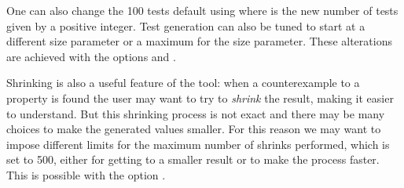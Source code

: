 
%
%
%


%
%
%


%
One can also change the 100 tests default  using  where
 is the new number of tests given by a positive integer.
%
%
Test generation can also be tuned to start at a different size parameter
or a maximum for the size parameter.
%
These alterations are achieved with the options
 and .


Shrinking is also a useful feature of the tool: when a counterexample to a property is found the user may want \plqc{}
to try to \emph{shrink} the result, making it easier to understand.
%
But this shrinking process is not exact and there may be many choices to
make the generated values smaller.
%
For this reason we may want to impose different limits for the maximum
number of shrinks performed, which is set to 500, either for getting to
a smaller result or to make the process faster.
%
This is possible with the option .
%

